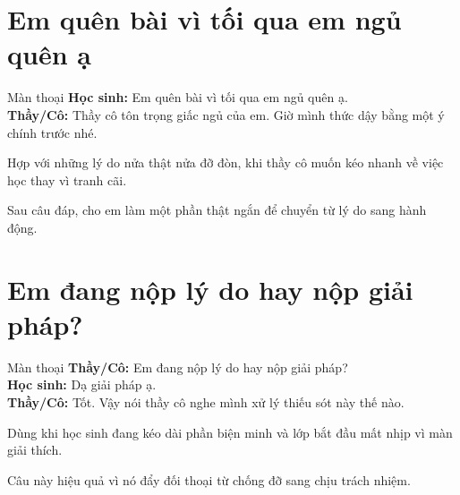 \section{Em quên bài vì tối qua em ngủ quên ạ}
\begin{manthoai}{Màn thoại}
\textbf{Học sinh:} Em quên bài vì tối qua em ngủ quên ạ.\\
\textbf{Thầy/Cô:} Thầy cô tôn trọng giấc ngủ của em. Giờ mình thức dậy bằng một ý chính trước nhé.
\end{manthoai}
\begin{dungkhinào}
Hợp với những lý do nửa thật nửa đỡ đòn, khi thầy cô muốn kéo nhanh về việc học thay vì tranh cãi.
\end{dungkhinào}
\begin{nhipthem}
Sau câu đáp, cho em làm một phần thật ngắn để chuyển từ lý do sang hành động.
\end{nhipthem}
\ngancach

\section{Em đang nộp lý do hay nộp giải pháp?}
\begin{manthoai}{Màn thoại}
\textbf{Thầy/Cô:} Em đang nộp lý do hay nộp giải pháp?\\
\textbf{Học sinh:} Dạ giải pháp ạ.\\
\textbf{Thầy/Cô:} Tốt. Vậy nói thầy cô nghe mình xử lý thiếu sót này thế nào.
\end{manthoai}
\begin{dungkhinào}
Dùng khi học sinh đang kéo dài phần biện minh và lớp bắt đầu mất nhịp vì màn giải thích.
\end{dungkhinào}
\begin{nhipthem}
Câu này hiệu quả vì nó đẩy đối thoại từ chống đỡ sang chịu trách nhiệm.
\end{nhipthem}
